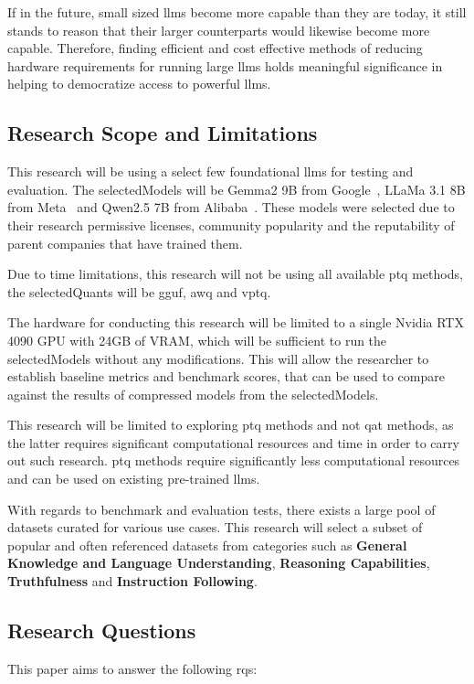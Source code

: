 \documentclass{ifacconf}
\begin{document}
	If in the future, small sized \glspl{llm} become more capable than they are today, it still stands to reason that their larger counterparts would likewise become more capable. Therefore, finding efficient and cost effective methods of reducing hardware requirements for running large \glspl{llm} holds meaningful significance in helping to democratize access to powerful \glspl{llm}.
	
	\subsection{Research Scope and Limitations}
	This research will be using a select few foundational \glspl{llm} for testing and evaluation. The \gls{selectedModels} will be Gemma2 9B from Google~\cite{gemmateam2024gemma2improvingopen}, LLaMa 3.1 8B from Meta~\cite{dubey2024llama3herdmodels} and Qwen2.5 7B from Alibaba~\cite{qwen2.5}. These models were selected due to their research permissive licenses, community popularity and the reputability of parent companies that have trained them.
	
	Due to time limitations, this research will not be using all available \gls{ptq} methods, the \gls{selectedQuants} will be \gls{gguf}, \gls{awq} and \gls{vptq}.
	
	The hardware for conducting this research will be limited to a single Nvidia RTX 4090 GPU with 24GB of VRAM, which will be sufficient to run the \gls{selectedModels} without any modifications. This will allow the researcher to establish baseline metrics and benchmark scores, that can be used to compare against the results of compressed models from the \gls{selectedModels}.
	
	This research will be limited to exploring \gls{ptq} methods and not \gls{qat} methods, as the latter requires significant computational resources and time in order to carry out such research. \gls{ptq} methods require significantly less computational resources and can be used on existing pre-trained \glspl{llm}.
	
	With regards to benchmark and evaluation tests, there exists a large pool of datasets curated for various use cases. This research will select a subset of popular and often referenced datasets from categories such as \textbf{General Knowledge and Language Understanding}, \textbf{Reasoning Capabilities}, \textbf{Truthfulness} and \textbf{Instruction Following}.
	
	\subsection{Research Questions}
	This paper aims to answer the following \glspl{rq}:
	
\end{document}
